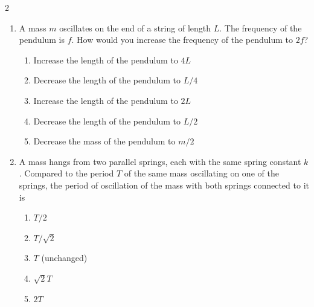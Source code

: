 {\begin{multicols}{2}
\begin{enumerate}[leftmargin=12pt]
  \item A mass $m$ oscillates on the end of a string of length $L$. The
    frequency of the pendulum is $f$. How would you increase the frequency of
    the pendulum to $2f$?
    \begin{center}
    \end{center}
    \begin{enumerate}[label=(\Alph*)]
    \item Increase the length of the pendulum to $4L$
    \item Decrease the length of the pendulum to $L/4$
    \item Increase the length of the pendulum to $2L$
    \item Decrease the length of the pendulum to $L/2$
    \item Decrease the mass of the pendulum to $m/2$
    \end{enumerate}
    
  \item A mass hangs from two parallel springs, each with the same spring
    constant $k$. Compared to the period $T$ of the same mass oscillating on
    one of the springs, the period of oscillation of the mass with both
    springs connected to it is
    \begin{enumerate}[label=(\Alph*)]
    \item $T/2$
    \item $T/\sqrt2$
    \item $T$ (unchanged)
    \item $\sqrt2T$
    \item $2T$
    \end{enumerate}
    

\end{enumerate}
\end{multicols}}
